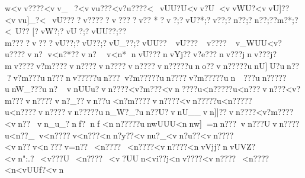 {{{{{{{{{{{{{{{{{{{{{{{{{{{{{{{{{{{{{{{{{{{{{{{{{{{{{{{{{{{{{{{{{{{{{{{{{{{{{{{{{{{{{{{{{{{{{{{{{{{{{{{{{{{{{{{{{{{{{{{{{{{{{{{{{{{{{{{{{{{{{{{{{{{{{{{{{{{{{{{{{{{{{{{{{{{{{{{{{{{{{{{{{{{{{{{{{{{{{{{{{{{{{{{{{{{{{{{{{{{{{{{{{{{{{{{{{{{{{{{{{{{{{{{{{{{{{{{{{{{{{{{{{{{{{{{{{{{{{{{{{{{{{{{{{{{{{{{{{{{{{{{{{{{{{{{{{{{{{{{{{{{{{{{{{{{{{{{{{{{{{{{{{{{{{{{{{{{{{{{{{{{{{{{{{{{{{{{{{{{{{{{{{{{{{{{{{{{{{{{{{{{{{{{{{{{{{{{{{{{{{{{{{{{{{{{{{{{{{{{{{{{{{{{{{{{{{{{{{{{{{{{{{{{{{{{{{{{{{{{{{{{{{{{{{{{{{{{{{{{{{{{{{{{{{{{{{{{{{{{{{{{{{{{{{{{{{{{{{{{{{{{{{{{{{{{{{{{{{{{{{{{{{{{{{{{{{{{{{{{{{{{{{{{{{{{{{{{{{{{{{{{{{{{{{{{{{{{{{{{{{{{{{{{{{{{{{{{{{{{{{{{{{{{{{{{{{{{{{{{{{{{{{{{{{{{{{{{{{{{{{{{{{{{{{{{{{{{{{{{{{{{{{{{{{{{{{{{{{{{{{{{{{{{{{{{{{{{{{{{{{{{{{{{{{{{{{{{{{{{{{{{{{{{{{{{{{{{{{{{{{{{{{{{{{{{{{{{{{{{{{{{{{{{{{{{{{{{{{{{{{{{{{{{{{{{{{{{{{{{{{{{{{{{{{{{{{{{{{{{{{{{{{{{{{{{{{{{{{{{{{{{{{{{{{{{{{{{{{{{{{{{{{{{{{{{{{{{{{{{{{{{{{{{{{{{{{{{{{{{{{{{{{{{{{{{{{{{{{{{{{{{{{{{{{{{{{{{{{{{{{{{{{{{{{{{{{{{{{{{{{{{{{{{{{{{{{{{{{{{{{{{{{{{{{{{{{{{{{{{{{{{{{{{{{{{{{{{{{{{{{{{{{{{{{{{{{{{{{{{{{{{{{{{{{{{{{{{{{{{{{{{{{{{{{{{{{{{{{{{{{{{{{{{{{{{{{{{{{{{{{{{{{{{{{{{{{{{{{{{{{{{{{{{{{{{{{{{{{{{{{{{{{{{{{{{{{{{{{{{{{{{{{{{{{{{{{{{{{{{{{{{{{{{{{{{{{{{{{{{{{{{{{{{{{{{{{{{{{{{{{{{{{{{{{{{{{{{{{{{{{{{{{{{{{{{{{{{{{{{{{{{{{{{{{{{{{{{{{{{{{{{{{{{{{{{{{{{{{{{{{{{{{{{{{{{{{{{{{{{{{{{{{{{{{{{{{{{{{{{{{{{{{{{{{{{{{{{{{{{{{{{{{{{{{{{{{{{{{{{{{{{{{{{{{{{{{{{{{{{{{{{{{{{{{{{{{{{{{{{{{{{{{{{{{{{{{{{{{{{{{{{{{{{{{{{{{{{{{{{{{{{{{{{{{{{{{{{{{{{{{{{{{{{{{{{{{{{{{{{{{{{{{{{{{{{{{{{{{{{{{{{{{{{{{{{{{{{{{{{{{{{{{{{{{{{{{{{{{{{{{{{{{{{{{{{{{{{{{{{{{{{{{{{{{{{{{{{{{{{{{{{{{{{{{{{{{{{{{{{{{{{{{{{{{{{{{{{{{{{{{{{{{{{{{{{{{{{{{{{{{{{{{{{{{{{{{{{{{{{{{{{{{{{{{{{{{{{{{{{{{{{{{{{{{{{{{{{{{{{{{{{{{{{{{{{{{{{{{{{{{{{{{{{{{{{{{{{{{{{{{{{{{{{{{{{{{{{{{{{{{{{{{{{{{{{{{{{{{{{{{{{{{{{{{{{{{{{{{{{{{{{{{{{{{{{{{{{{{{{{{{{{{{{{{{{{{{{{{{{{{{{{{{{{{{{{{{{{{{{{{{{{{{{{{{{{{{{{{{{{{{{{{{{{{{{{{{{{{{{{{{{{{{{{{{{{{{{{{{{{{{{{{{{{{{{{{{{{{{{{{{{{{{{{{{{{{{{{{{{{{{{{{{{{{{{{{{{{{{{{{{{{{{{{{{{{{{{{{{{{{{{{{{{{{{{{{{{{{{{{{{{{{{{{{{{{{{{{{{{{{{{{{{{{{{{{{{{{{{{{{{{{{{{{{{{{{{{{{{{{{{{{{{{{{{{{{{{{{{{{{{{{{{{{{{{{{{{{{{{{{{{{{{{{{{{{{{{{{{{{{{{{{{{{{{{{{{{{{{{{{{{{{{{{{{{{{{{{{{{{{{{{{{{{{{{{{{{{{{{{{{{{w<vv????<vv_~?<vvu???<v?u????<~vUU?U<vv?U<vvWU?}<vvU]??<vvu]_?<~vU????v?????v????v??
*?v?;?vU?*;?v??  ;?n??  ;?n??  ;??m?*  ;?<~U??
[?vW?  ;?vU? ;?vUU??;??m??? ?v?? ?vU?? ;?vU?? ;?vU_??;?vUU??~vU???~v????~v_WUU<v?u????vn?   v<n?*??vn?  v<n*
  nvU???nvYj??v?e ???nv???jnv???j?mv????v?m????vn????vn????vn????vn?????uno??vn?????unU]U?un???v?m???un???nv?????un???v?m?????un????v?m?????un~~???un?????unW_???un?vnUUu?vn????<v?m???<vn????u<n?????u<n???vn???<v?m???vn????vn?_??vn??u<n?m????vn????<vn?????u<n?????u<n????vn????vn?????un_W?_?un??U?vnU__{vn]]??vn????<v?m????<vn??vn_u_?nf  ?nf    <nn?????unwUUU<nnw]=nn???vn???Uvn}????u<n??_v<n????v<n???<nn?y??<vnu}?_<vn?u??<vn????<vn??v<n???v=n  ??~<n????~<n????<vn????<nvVjj?nvUVZ?<vn":.?~<v???U~<n????~<v?UUn<vi??j<nv????<vn????~<n????<n<vUUf?<vn }}}}}}}}}}}}}}}}}}}}}}}}}}}}}}}}}}}}}}}}}}}}}}}}}}}}}}}}}}}}}}}}}}}}}}}}}}}}}}}}}}}}}}}}}}}}}}}}}}}}}}}}}}}}}}}}}}}}}}}}}}}}}}}}}}}}}}}}}}}}}}}}}}}}}}}}}}}}}}}}}}}}}}}}}}}}}}}}}}}}}}}}}}}}}}}}}}}}}}}}}}}}}}}}}}}}}}}}}}}}}}}}}}}}}}}}}}}}}}}}}}}}}}}}}}}}}}}}}}}}}}}}}}}}}}}}}}}}}}}}}}}}}}}}}}}}}}}}}}}}}}}}}}}}}}}}}}}}}}}}}}}}}}}}}}}}}}}}}}}}}}}}}}}}}}}}}}}}}}}}}}}}}}}}}}}}}}}}}}}}}}}}}}}}}}}}}}}}}}}}}}}}}}}}}}}}}}}}}}}}}}}}}}}}}}}}}}}}}}}}}}}}}}}}}}}}}}}}}}}}}}}}}}}}}}}}}}}}}}}}}}}}}}}}}}}}}}}}}}}}}}}}}}}}}}}}}}}}}}}}}}}}}}}}}}}}}}}}}}}}}}}}}}}}}}}}}}}}}}}}}}}}}}}}}}}}}}}}}}}}}}}}}}}}}}}}}}}}}}}}}}}}}}}}}}}}}}}}}}}}}}}}}}}}}}}}}}}}}}}}}}}}}}}}}}}}}}}}}}}}}}}}}}}}}}}}}}}}}}}}}}}}}}}}}}}}}}}}}}}}}}}}}}}}}}}}}}}}}}}}}}}}}}}}}}}}}}}}}}}}}}}}}}}}}}}}}}}}}}}}}}}}}}}}}}}}}}}}}}}}}}}}}}}}}}}}}}}}}}}}}}}}}}}}}}}}}}}}}}}}}}}}}}}}}}}}}}}}}}}}}}}}}}}}}}}}}}}}}}}}}}}}}}}}}}}}}}}}}}}}}}}}}}}}}}}}}}}}}}}}}}}}}}}}}}}}}}}}}}}}}}}}}}}}}}}}}}}}}}}}}}}}}}}}}}}}}}}}}}}}}}}}}}}}}}}}}}}}}}}}}}}}}}}}}}}}}}}}}}}}}}}}}}}}}}}}}}}}}}}}}}}}}}}}}}}}}}}}}}}}}}}}}}}}}}}}}}}}}}}}}}}}}}}}}}}}}}}}}}}}}}}}}}}}}}}}}}}}}}}}}}}}}}}}}}}}}}}}}}}}}}}}}}}}}}}}}}}}}}}}}}}}}}}}}}}}}}}}}}}}}}}}}}}}}}}}}}}}}}}}}}}}}}}}}}}}}}}}}}}}}}}}}}}}}}}}}}}}}}}}}}}}}}}}}}}}}}}}}}}}}}}}}}}}}}}}}}}}}}}}}}}}}}}}}}}}}}}}}}}}}}}}}}}}}}}}}}}}}}}}}}}}}}}}}}}}}}}}}}}}}}}}}}}}}}}}}}}}}}}}}}}}}}}}}}}}}}}}}}}}}}}}}}}}}}}}}}}}}}}}}}}}}}}}}}}}}}}}}}}}}}}}}}}}}}}}}}}}}}}}}}}}}}}}}}}}}}}}}}}}}}}}}}}}}}}}}}}}}}}}}}}}}}}}}}}}}}}}}}}}}}}}}}}}}}}}}}}}}}}}}}}}}}}}}}}}}}}}}}}}}}}}}}}}}}}}}}}}}}}}}}}}}}}}}}}}}}}}}}}}}}}}}}}}}}}}}}}}}}}}}}}}}}}}}}}}}}}}}}}}}}}}}}}}}}}}}}}}}}}}}}}}}}}}}}}}}}}}}}}}}}}}}}}}}}}}}}}}}}}}}}}}}}}}}}}}}}}}}}}}}}}}}}}}}}}}}}}}}}}}}}}}}}}}}}}}}}}}}}}}}}}}}}}}}}}}}}}}}}}}}}}}}}}}}}}}}}}}}}}}}}}}}}}}}}}}}}}}}}}}}}}}}}}}}}}}}}}}}}}}}}}}}}}}}}}}}}}}}}}}}}}}}}}}}}}}}}}}}}}}}}}}}}}}}}}}}}}}}}}}}}}}}}}}}}}}}}}}}}}}}}}}}}}}}}}}}}}}}}}}}}}}}}}}}}}}}}}}}}}}}}}}}}}}}}}}}}}}}}}}}}}}}}}}}}}}}}}}}}}}}}}}}}}}}}}}}}}}}}}}}}}}}}}}}}}}}}}}}}}}}}}}}}}}}}}}}}}}}}}}}}}}}}}}}}}}}}}}}}}}}}}}}}}}}}}}}}}}}}}}}}}}}}}}}}}}}}}}}}}}}}}}}}}}}}}}}}}}}}}}}}}}}}}}}}}}}}}}}}}}}}}}}}}}}}}}}}}}}}}}}}}}}}}}}}}}}}}}}}}}}}}}}}}}}}}}}}}}}}}}}}}}}}}}}}}}}}}}}}}}}}}}}}}}}}}}}}}}}}}}}}}}}}}}}}}}}}}}}}}}}}}}}}}}}}}}}}}}}}}}}}
